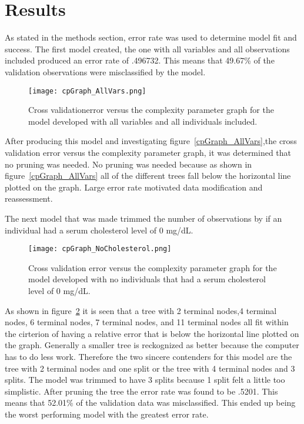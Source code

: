 \documentclass[12pt]{article}
\begin{document}
\section{Results}
\label{sec:resu}
As stated in the methods section, error rate was used to determine model fit and success.
The first model created, the one with all variables and all observations included produced an  error rate of .496732. This means that 49.67\% of the validation observations were misclassified by the model. 
\begin{figure}[tbp]
  \centering
  \texttt{[image: cpGraph\_AllVars.png]}
  \caption{Cross validationerror versus the complexity parameter graph for the model developed with all variables and all individuals included.}
  \label{fig:cpGraph_AllVars}
\end{figure}
After producing this model and investigating figure~\ref*{cpGraph_AllVars},the cross validation error versus the complexity parameter graph, it was determined that no pruning was needed. No pruning was needed because as shown in figure~\ref*{cpGraph_AllVars} all of the different trees fall below the horizontal line plotted on the graph. Large error rate motivated data modification and reassessment. \par
The next model that was made trimmed the number of observations by if an individual had a serum cholesterol level of 0 mg/dL. 
\begin{figure}[tbp]
  \centering
  \texttt{[image: cpGraph\_NoCholesterol.png]}
  \caption{Cross validation error versus the complexity parameter graph for the model developed with no individuals that had a serum cholesterol level of 0 mg/dL.}
  \label{fig:cpGraph_NoCholesterol}
\end{figure}
As shown in figure~\ref*{fig:cpGraph_NoCholesterol} it is seen that a tree with 2 terminal nodes,4 terminal nodes, 6 terminal nodes, 7 terminal nodes, and 11 terminal nodes all fit within the cirterion of having a relative error that is below the horizontal line plotted on the graph. Generally a smaller tree is reckognized as better because the computer has to do less work. Therefore the two sincere contenders for this model are the tree with 2 terminal nodes and one split or the tree with 4 terminal nodes and 3 splits. The model was trimmed to have 3 splits because 1 split felt a little too simplistic. After pruning the tree the error rate was found to be .5201. This means that 52.01\% of the validation data was misclassified. This ended up being the worst performing model with the greatest error rate. \par
\end{document}
